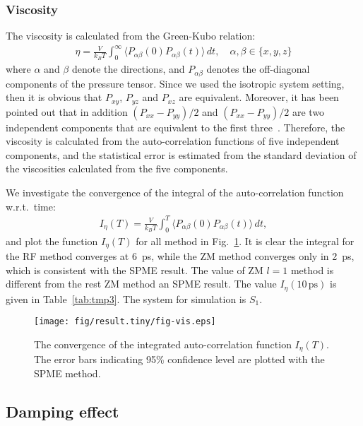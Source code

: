 \documentclass[aip,jcp,a4paper,reprint,unsortedaddress,onecolumn,fleqn]{revtex4-1}
\newcommand{\systemsb}{S_1}
\begin{document}
\subsubsection{Viscosity}
The viscosity is calculated from the Green-Kubo relation:
\begin{align}
  \eta = \frac{V}{k_BT}\int_0^\infty\langle P_{\alpha\beta}(0) P_{\alpha\beta}(t)\rangle\,dt, \quad \alpha,\beta \in \{x, y, z\}
\end{align}
where $\alpha$ and $\beta$ denote the directions, and
$P_{\alpha\beta}$ denotes the off-diagonal components of the pressure
tensor. Since we used the isotropic system setting, then it is obvious
that $P_{xy}$, $P_{yz}$ and $P_{xz}$ are equivalent. Moreover, it has
been pointed out that in addition $(P_{xx} - P_{yy})/2$ and $(P_{xx} -
P_{yy})/2$ are two independent components that are equivalent to the
first three~\cite{alfe1998first}. Therefore, the viscosity is
calculated from the auto-correlation functions of five independent
components, and the statistical error is estimated from the standard
deviation of the viscosities calculated from the five components.

We investigate the convergence of the integral of the auto-correlation function w.r.t.~time:
\begin{align}
  I_\eta(T) = \frac{V}{k_BT}\int_0^T\langle P_{\alpha\beta}(0) P_{\alpha\beta}(t)\rangle\,dt,
\end{align}
and plot the function $I_\eta(T) $ for all method in
Fig.~\ref{fig:tmp4}.  It is clear the integral for the RF method
converges at 6~ps, while the ZM method converges only in 2~ps, which
is consistent with the SPME result.  The value of ZM $l=1$ method is
different from the rest ZM method an SPME result.  The value
$I_\eta(10\,\textrm{ps})$ is given in Table~\ref{tab:tmp3}.  The
system for simulation is $\systemsb$.

\begin{figure}
  \centering
  \texttt{[image: fig/result.tiny/fig-vis.eps]}
  \caption{The convergence of the integrated auto-correlation function $I_\eta(T) $. The error bars indicating 95\% confidence level are plotted with the SPME method.}
  \label{fig:tmp4}
\end{figure}


\subsection{Damping effect}
\end{document}
